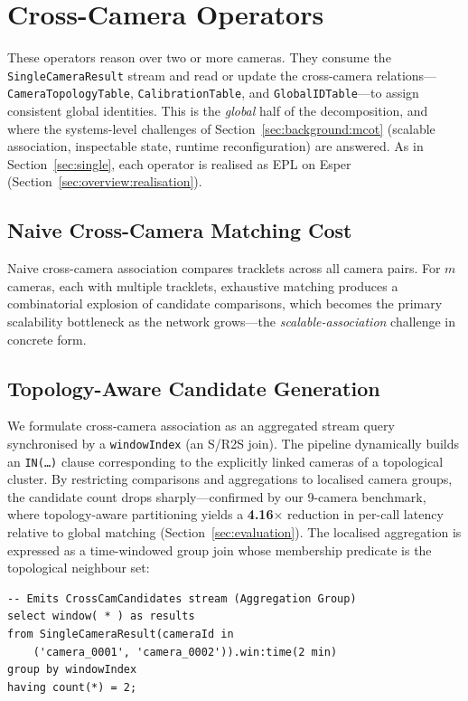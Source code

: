 \documentclass[review]{elsarticle}
\begin{document}
\section{Cross-Camera Operators}\label{sec:multi}
These operators reason over two or more cameras. They consume the \texttt{SingleCameraResult} stream and read or update the cross-camera relations---\texttt{CameraTopologyTable}, \texttt{CalibrationTable}, and \texttt{GlobalIDTable}---to assign consistent global identities. This is the \emph{global} half of the decomposition, and where the systems-level challenges of Section~\ref{sec:background:mcot} (scalable association, inspectable state, runtime reconfiguration) are answered. As in Section~\ref{sec:single}, each operator is realised as EPL on Esper (Section~\ref{sec:overview:realisation}).

\subsection{Naive Cross-Camera Matching Cost}
\label{sec:multi:naive}
Naive cross-camera association compares tracklets across all camera pairs. For $m$ cameras, each with multiple tracklets, exhaustive matching produces a combinatorial explosion of candidate comparisons, which becomes the primary scalability bottleneck as the network grows---the \emph{scalable-association} challenge in concrete form.

\subsection{Topology-Aware Candidate Generation}
\label{sec:multi:assoc}
We formulate cross-camera association as an aggregated stream query synchronised by a \texttt{windowIndex} (an S/R2S join). The pipeline dynamically builds an \texttt{IN(\dots)} clause corresponding to the explicitly linked cameras of a topological cluster. By restricting comparisons and aggregations to localised camera groups, the candidate count drops sharply---confirmed by our 9-camera benchmark, where topology-aware partitioning yields a \textbf{4.16$\times$} reduction in per-call latency relative to global matching (Section~\ref{sec:evaluation}). The localised aggregation is expressed as a time-windowed group join whose membership predicate is the topological neighbour set:
\begin{verbatim}
-- Emits CrossCamCandidates stream (Aggregation Group)
select window( * ) as results
from SingleCameraResult(cameraId in
    ('camera_0001', 'camera_0002')).win:time(2 min)
group by windowIndex
having count(*) = 2;
\end{verbatim}
\end{document}
